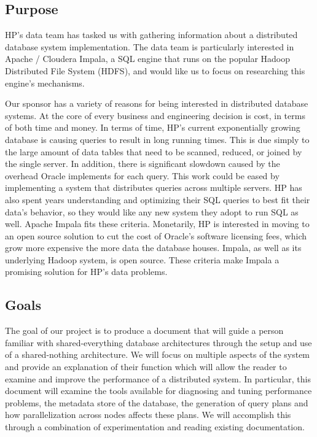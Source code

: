 \documentclass[onecolumn, draftclsnofoot,10pt, compsoc]{IEEEtran}
\begin{document}
\subsection{Purpose}
HP’s data team has tasked us with gathering information about a distributed database system implementation. 
The data team is particularly interested in Apache / Cloudera Impala, a SQL engine that runs on the popular Hadoop Distributed File System (HDFS), and would like us to focus on researching this engine’s mechanisms. 

Our sponsor has a variety of reasons for being interested in distributed database systems.
At the core of every business and engineering decision is cost, in terms of both time and money.
In terms of time, HP’s current exponentially growing database is causing queries to result in long running times.
This is due simply to the large amount of data tables that need to be scanned, reduced, or joined by the single server.
In addition, there is significant slowdown caused by the overhead Oracle implements for each query.
This work could be eased by implementing a system that distributes queries across multiple servers.
HP has also spent years understanding and optimizing their SQL queries to best fit their data’s behavior, so they would like any new system they adopt to run SQL as well.
Apache Impala fits these criteria.
Monetarily, HP is interested in moving to an open source solution to cut the cost of Oracle’s software licensing fees, which grow more expensive the more data the database houses.
Impala, as well as its underlying Hadoop system, is open source. 
These criteria make Impala a promising solution for HP’s data problems.

\subsection{Goals}
The goal of our project is to produce a document that will guide a person familiar with shared-everything database architectures through the setup and use of a shared-nothing architecture.
We will focus on multiple aspects of the system and provide an explanation of their function which will allow the reader to examine and improve the performance of a distributed system.
In particular, this document will examine the tools available for diagnosing and tuning performance problems, the metadata store of the database, the generation of query plans and how parallelization across nodes affects these plans.
We will accomplish this through a combination of experimentation and reading existing documentation.
\end{document}
